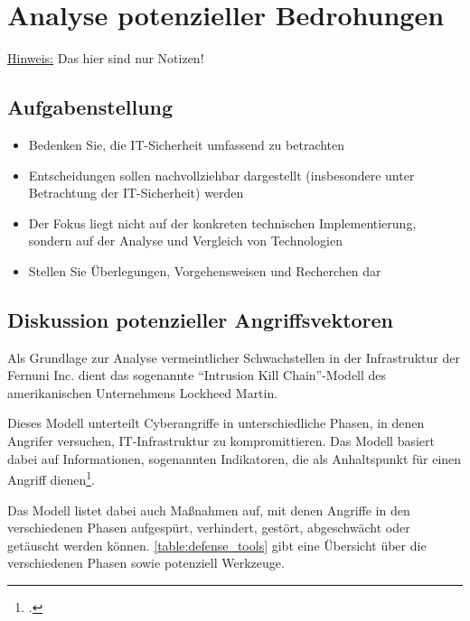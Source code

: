 \section{Analyse potenzieller Bedrohungen}

\underline{Hinweis:} Das hier sind nur Notizen!

\subsection*{Aufgabenstellung}
\begin{itemize}
    \item Bedenken Sie, die IT-Sicherheit umfassend zu betrachten
    \item  Entscheidungen sollen nachvollziehbar dargestellt (insbesondere unter Betrachtung der IT-Sicherheit) werden
    \item Der Fokus liegt nicht auf der konkreten technischen Implementierung, sondern auf der Analyse
    und Vergleich von Technologien
    \item Stellen Sie Überlegungen, Vorgehensweisen und Recherchen dar
\end{itemize}

\subsection{Diskussion potenzieller Angriffsvektoren}

Als Grundlage zur Analyse vermeintlicher Schwachstellen in der Infrastruktur der Fernuni Inc. dient das sogenannte \enquote{Intrusion Kill Chain}-Modell des amerikanischen Unternehmens Lockheed Martin.

Dieses Modell unterteilt Cyberangriffe in unterschiedliche Phasen, in denen Angrifer versuchen, IT-Infrastruktur zu kompromittieren. Das Modell basiert dabei auf Informationen, sogenannten Indikatoren, die als Anhaltspunkt für einen Angriff dienen\footcite[Vgl.][]{hutchinsIntelligenceDrivenComputerNetwork}.

Das Modell listet dabei auch Maßnahmen auf, mit denen Angriffe in den verschiedenen Phasen aufgespürt, verhindert, gestört, abgeschwächt oder getäuscht werden können. \autoref{table:defense_tools} gibt eine Übersicht über die verschiedenen Phasen sowie potenziell Werkzeuge.

